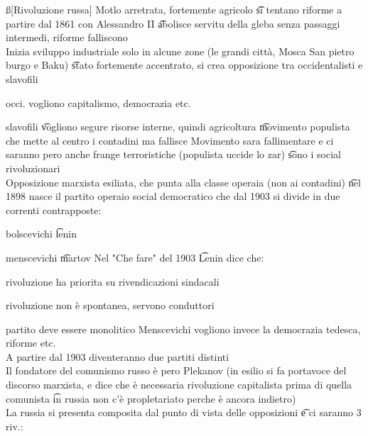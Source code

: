 \documentclass[12pt]{article}
\begin{document}
\ss[Rivoluzione russa]
Motlo arretrata, fortemente agricolo \t si tentano riforme a partire dal 1861 con Alessandro II \t abolisce servitu della gleba senza passaggi intermedi, riforme falliscono \\
Inizia sviluppo industriale solo in alcune zone (le grandi città, Mosca San pietro burgo e Baku) \t stato fortemente accentrato, si crea opposizione tra occidentalisti e slavofili \\
\bi
  \item occi. vogliono capitalismo, democrazia etc. 
  \item slavofili \t vogliono segure risorse interne, quindi agricoltura \t movimento populista che mette al centro i contadini ma fallisce
\ei
Movimento sara fallimentare e ci saranno pero anche frange terroristiche (populista uccide lo zar) \t sono i social rivoluzionari \\
Opposizione marxista esiliata, che punta alla classe operaia (non ai contadini) \t nel 1898 nasce il partito operaio social democratico che dal 1903 si divide in due correnti contrapposte:
\bi
  \item bolscevichi \t lenin
  \item menscevichi \t martov
\ei
Nel "Che fare" del 1903 \t Lenin dice che:
\bi
  \item rivoluzione ha priorita su rivendicazioni sindacali
  \item rivoluzione non è spontanea, servono conduttori
  \item partito deve essere monolitico
\ei
Menscevichi vogliono invece la democrazia tedesca, riforme etc. \\
A partire dal 1903 diventeranno due partiti distinti \\
Il fondatore del comunismo russo è pero Plekanov (in esilio si fa portavoce del discorso marxista, e dice che è necessaria rivoluzione capitalista prima di quella comunista \t in russia non c'è propletariato perche è ancora indietro) \\
La russia si presenta composita dal punto di vista delle opposizioni \t e ci saranno 3 riv.:
\end{document}
